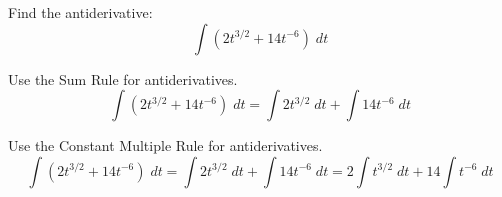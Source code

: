 \documentclass{ximera}
\author{Emma Smith Zbarsky\and Nela Lakos}
\begin{document}
\begin{exercise}

Find the antiderivative: \[\int (2t^{3/2}+14t^{-6})\; dt\]


\begin{hint}
Use the Sum Rule for antiderivatives.
\[\int (2t^{3/2}+14t^{-6})\; dt=\int 2t^{3/2}\; dt+\int14t^{-6}\; dt\]
\end{hint}


\begin{hint}
Use the Constant Multiple Rule for antiderivatives.
\[\int (2t^{3/2}+14t^{-6})\; dt=\int 2t^{3/2}\; dt+\int14t^{-6}\; dt=2\int t^{3/2}\; dt+14\int t^{-6}\; dt\]

\end{hint}


\begin{multipleChoice}
\end{multipleChoice}

\end{exercise}
\end{document}
